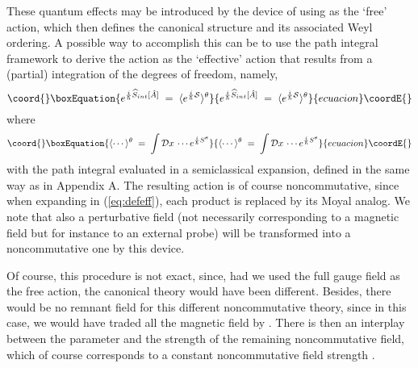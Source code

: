 \documentclass[a4paper,12pt]{article}
\begin{document}
These quantum effects may be introduced by the device of using
\coordHE{} as the `free' action, which
then defines
the canonical structure and its associated Weyl ordering. A
possible
way to accomplish this can be to use the path integral framework to
derive the action \coordHE{} as the `effective' action that
results from a (partial) integration of the degrees of freedom,
namely,
\begin{equation}\coord{}\boxEquation{
  \label{eq:defeff}
e^{\frac{i}{\hbar}{\widehat S}_{int}[{\hat A}]}\;=\; 
\langle e^{\frac{i}{\hbar} {\mathcal S}}\rangle^\theta  
}{
  e^{\frac{i}{\hbar}{\widehat S}_{int}[{\hat A}]}\;=\; 
\langle e^{\frac{i}{\hbar} {\mathcal S}}\rangle^\theta  
}{ecuacion}\coordE{}\end{equation}
where
\begin{equation}\coord{}\boxEquation{
\langle \cdots \rangle^\theta \;=\; \int {\mathcal D}x \, \cdots
e^{\frac{i}{\hbar} S^\theta} 
}{
\langle \cdots \rangle^\theta \;=\; \int {\mathcal D}x \, \cdots
e^{\frac{i}{\hbar} S^\theta} 
}{ecuacion}\coordE{}\end{equation}   
with the path integral evaluated in a semiclassical expansion,
defined
in the same way as in Appendix A. The resulting \coordHE{}
action
is of course noncommutative, since when expanding \coordHE{} in
(\ref{eq:defeff}), each product is replaced by its Moyal analog. We
note that also a perturbative field \coordHE{} (not necessarily
corresponding
to a magnetic field but for instance to an external probe) will be
transformed into a noncommutative one by this device.

Of course, this procedure is not exact, since, had we used the full
gauge field as the free action, the canonical theory would have
been
different.  Besides, there would be no remnant field for this
different noncommutative theory, since in this case, we would have
traded all the magnetic field \coordHE{} by \coordHE{}.  There is then an
interplay between the \myHighlight{$\theta$}\coordHE{} parameter and the strength of the
remaining
noncommutative field, which of course corresponds to a constant
noncommutative field strength \coordHE{}.
\end{document}
